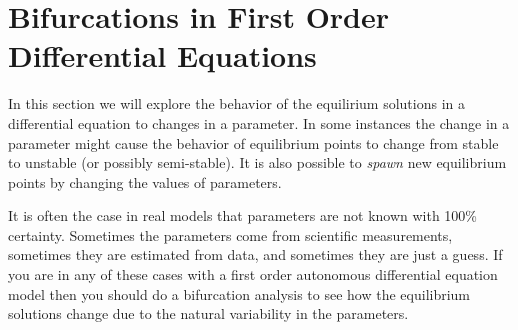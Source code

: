 \newpage\section{Bifurcations in First Order Differential Equations}
In this section we will explore the behavior of the equilirium solutions in a differential
equation to changes in a parameter.  In some instances the change in a parameter might
cause the behavior of equilibrium points to change from stable to unstable (or possibly
semi-stable).  It is also possible to {\it spawn} new equilibrium points by changing the
values of parameters. 

It is often the case in real models that parameters are not known with 100\% certainty.
Sometimes the parameters come from scientific measurements, sometimes they are estimated
from data, and sometimes they are just a guess.  If you are in any of these cases with a
first order autonomous differential equation model then you should do a bifurcation
analysis to see how the equilibrium solutions change due to the natural variability in the
parameters.  

